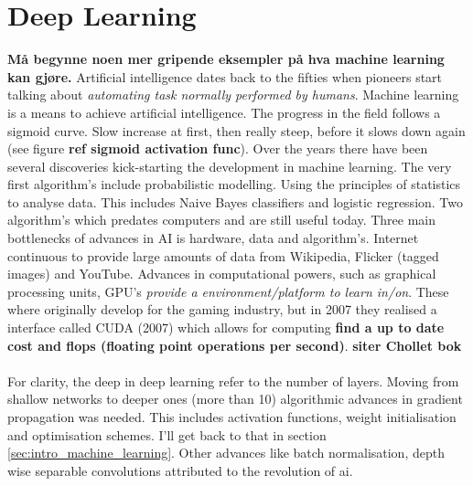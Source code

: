\section{Deep Learning} \label{sec:intro_deep_learning}
\textbf{Må begynne noen mer gripende eksempler på hva machine learning kan gjøre.}
Artificial intelligence dates back to the fifties when pioneers start talking about \textit{automating task normally performed by humans}. Machine learning is a means to achieve artificial intelligence. The progress in the field follows a sigmoid curve. Slow increase at first, then really steep, before it slows down again (see figure \textbf{ref sigmoid activation func}). Over the years there have been several discoveries kick-starting the development in machine learning. The very first algorithm's include probabilistic modelling. Using the principles of statistics to analyse data. This includes Naive Bayes classifiers and logistic regression. Two algorithm's which predates computers and are still useful today. Three main bottlenecks of advances in AI is hardware, data and algorithm's. Internet continuous to provide large amounts of data from Wikipedia, Flicker (tagged images) and YouTube. Advances in computational powers, such as graphical processing units, GPU's \textit{provide a environment/platform to learn in/on}. These where originally develop for the gaming industry, but in 2007 they realised a interface called CUDA (2007) which allows for computing \textbf{find a up to date cost and flops (floating point operations per second)}. \textbf{siter Chollet bok}
\\ \\ 
For clarity, the deep in deep learning refer to the number of layers. Moving from shallow networks to deeper ones (more than 10) algorithmic advances in gradient propagation was needed. This includes activation functions, weight initialisation and optimisation schemes. I'll get back to that in section \ref{sec:intro_machine_learning}. Other advances like batch normalisation, depth wise separable convolutions attributed to the revolution of \acrshort{ai}. 
